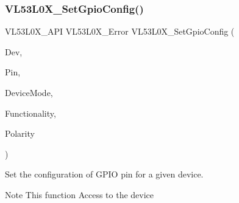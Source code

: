 \subsubsection{\texorpdfstring{V\+L53\+L0\+X\+\_\+\+Set\+Gpio\+Config()}{VL53L0X\_SetGpioConfig()}}
{\footnotesize\ttfamily V\+L53\+L0\+X\+\_\+\+A\+PI V\+L53\+L0\+X\+\_\+\+Error V\+L53\+L0\+X\+\_\+\+Set\+Gpio\+Config (\begin{DoxyParamCaption}\item[{\hyperlink{group__VL53L0X__platform__group_ga2d6405308b1dd524b462f1b8fb97d167}{V\+L53\+L0\+X\+\_\+\+D\+EV}}]{Dev,  }\item[{\hyperlink{vl53l0x__types_8h_aba7bc1797add20fe3efdf37ced1182c5}{uint8\+\_\+t}}]{Pin,  }\item[{V\+L53\+L0\+X\+\_\+\+Device\+Modes}]{Device\+Mode,  }\item[{V\+L53\+L0\+X\+\_\+\+Gpio\+Functionality}]{Functionality,  }\item[{V\+L53\+L0\+X\+\_\+\+Interrupt\+Polarity}]{Polarity }\end{DoxyParamCaption})}



Set the configuration of G\+P\+IO pin for a given device. 

\begin{DoxyNote}{Note}
This function Access to the device
\end{DoxyNote}

